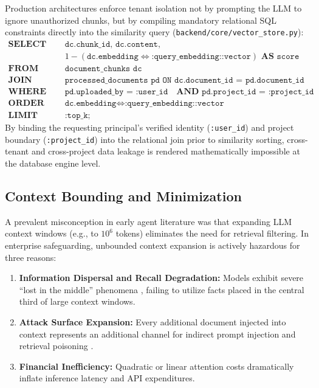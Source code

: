 \documentclass[10pt,a4paper,twocolumn]{article}
\begin{document}
Production architectures enforce tenant isolation not by prompting the LLM to ignore unauthorized chunks, but by compiling mandatory relational SQL constraints directly into the similarity query (\texttt{backend/core/vector_store.py}):
\begin{equation}
\label{eq:sql_tenant}
\begin{split}
\textbf{SELECT } & \texttt{dc.chunk\_id, dc.content,} \\
& 1 - (\texttt{dc.embedding} \Leftrightarrow \texttt{:query\_embedding::vector}) \textbf{ AS } \texttt{score} \\
\textbf{FROM } & \texttt{document\_chunks dc} \\
\textbf{JOIN } & \texttt{processed\_documents pd ON dc.document\_id = pd.document\_id} \\
\textbf{WHERE } & \texttt{pd.uploaded\_by = :user\_id} \quad \textbf{AND } \texttt{pd.project\_id = :project\_id} \\
\textbf{ORDER BY } & \texttt{dc.embedding} \Leftrightarrow \texttt{:query\_embedding::vector} \\
\textbf{LIMIT } & \texttt{:top\_k;}
\end{split}
\end{equation}
By binding the requesting principal's verified identity (\texttt{:user\_id}) and project boundary (\texttt{:project\_id}) into the relational join prior to similarity sorting, cross-tenant and cross-project data leakage is rendered mathematically impossible at the database engine level.

\subsection{Context Bounding and Minimization}
A prevalent misconception in early agent literature was that expanding LLM context windows (e.g., to $10^6$ tokens) eliminates the need for retrieval filtering. In enterprise safeguarding, unbounded context expansion is actively hazardous for three reasons:
\begin{enumerate}[leftmargin=*]
  \item \textbf{Information Dispersal and Recall Degradation:} Models exhibit severe ``lost in the middle'' phenomena \cite{liu2024lost}, failing to utilize facts placed in the central third of large context windows.
  \item \textbf{Attack Surface Expansion:} Every additional document injected into context represents an additional channel for indirect prompt injection and retrieval poisoning \cite{greshake2023indirect,zou2024poisonedrag}.
  \item \textbf{Financial Inefficiency:} Quadratic or linear attention costs dramatically inflate inference latency and API expenditures.
\end{enumerate}
\end{document}
